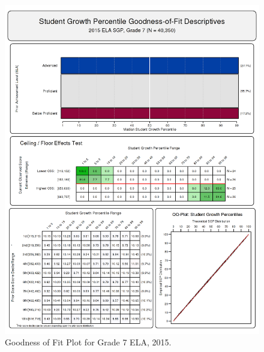 \documentclass[12pt]{article}
\begin{document}
\begin{figure}[htbp]
\centering
\includegraphics{../img/Goodness_of_Fit/ELA.2015/2015_ELA_7;2014_ELA_6;2013_ELA_5;2012_ELA_4;2011_ELA_3.png}
\caption{Goodness of Fit Plot for Grade 7 ELA, 2015.}
\end{figure}
\end{document}
